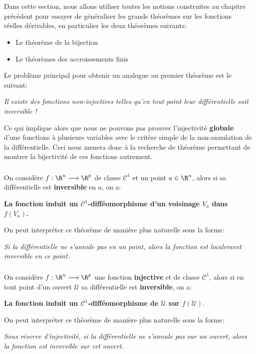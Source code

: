 \chapter*{}
Dans cette section, nous allons utiliser toutes les notions construites au chapitre précédent pour essayer de généraliser les grands théorèmes sur les fonctions réelles dérivables, en particulier les deux théorèmes suivants:
\begin{itemize}
   \item Le théorème de la bijection
   \item Le théorèmes des accroissements finis
\end{itemize}
Le problème principal pour obtenir un analogue au premier théorème est le suivant:
\begin{center}
   \textit{Il existe des fonctions non-injectives telles qu'en tout point leur différentielle soit inversible !}
\end{center}
Ce qui implique alors que nous ne pouvons pas prouver l'injectivité \textbf{globale} d'une fonctions à plusieurs variables avec le critère simple de la non-annulation de la différentielle. Ceci nous menera donc à la recherche de théorème permettant de montrer la bijectivité de ces fonctions autrement.

\subsection*{}
On considère \(f : \R^n \longrightarrow \R^p\) de classe \(\mathcal{C}^1\) et un point \(a \in \R^n\), alors si sa différentielle est \textbf{inversible} en \(a\), on a:
\begin{center}
   \textbf{La fonction induit un \(\mathcal{C}^1\)-difféomorphisme d'un voisinage \(V_a\) dans \(f(V_a)\).}
\end{center}
On peut interpréter ce théorème de manière plus naturelle sous la forme:
\begin{center}
   \textit{Si la différentielle ne s'annule pas en un point, alors la fonction est localement inversible en ce point.}
\end{center}

\subsection*{}
On considère \(f : \R^n \longrightarrow \R^p\) une fonction \textbf{injective} et de classe \(\mathcal{C}^1\), alors si en tout point d'un ouvert \(\mathcal{U}\) sa différentielle est \textbf{inversible}, on a:
\begin{center}
   \textbf{La fonction induit un \(\mathcal{C}^1\)-difféomorphisme de \(\mathcal{U}\) sur \(f(\mathcal{U}).\)}
\end{center}
On peut interpréter ce théorème de manière plus naturelle sous la forme:
\begin{center}
   \textit{Sous réserve d'injectivité, si la différentielle ne s'annule pas sur un ouvert, alors la fonction est inversible sur cet ouvert.}
\end{center}

